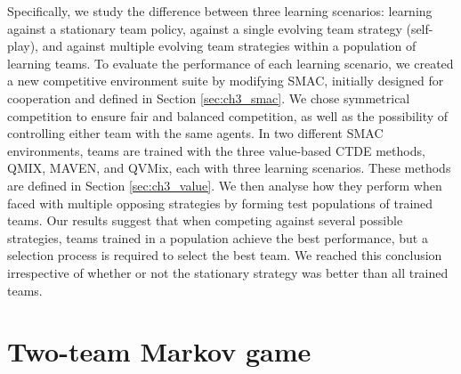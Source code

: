 Specifically, we study the difference between three learning scenarios: learning against a stationary team policy, against a single evolving team strategy (self-play), and against multiple evolving team strategies within a population of learning teams.
To evaluate the performance of each learning scenario, we created a new competitive environment suite by modifying SMAC, initially designed for cooperation and defined in Section \ref{sec:ch3_smac}.
We chose symmetrical competition to ensure fair and balanced competition, as well as the possibility of controlling either team with the same agents.
In two different SMAC environments, teams are trained with the three value-based CTDE methods, QMIX, MAVEN, and QVMix, each with three learning scenarios.
These methods are defined in Section \ref{sec:ch3_value}.
We then analyse how they perform when faced with multiple opposing strategies by forming test populations of trained teams.
Our results suggest that when competing against several possible strategies, teams trained in a population achieve the best performance, but a selection process is required to select the best team.
We reached this conclusion irrespective of whether or not the stationary strategy was better than all trained teams.

\section{Two-team Markov game}\label{sec:ch7_2teammarkov}

